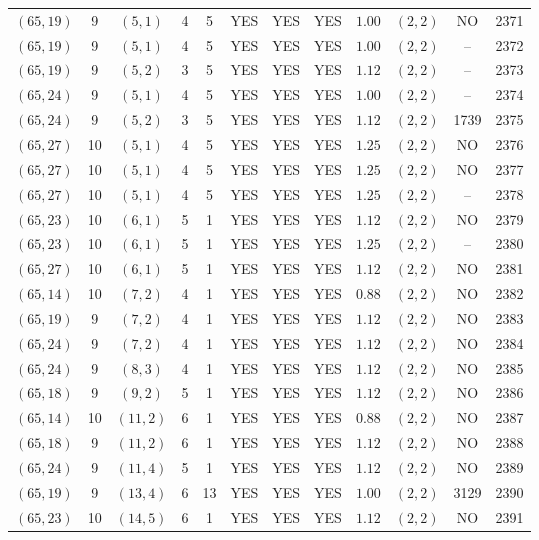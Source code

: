 \begin{longtable}{|c|c|c|c|c|c|c|c|c|c|c|c|}
$(65,19)$ & 9 & $(5,1)$ & 4 & 5 & YES & YES & YES & $1.00$ & $(2,2)$ & NO & 2371\\
$(65,19)$ & 9 & $(5,1)$ & 4 & 5 & YES & YES & YES & $1.00$ & $(2,2)$ & -- & 2372\\
$(65,19)$ & 9 & $(5,2)$ & 3 & 5 & YES & YES & YES & $1.12$ & $(2,2)$ & -- & 2373\\
$(65,24)$ & 9 & $(5,1)$ & 4 & 5 & YES & YES & YES & $1.00$ & $(2,2)$ & -- & 2374\\
$(65,24)$ & 9 & $(5,2)$ & 3 & 5 & YES & YES & YES & $1.12$ & $(2,2)$ & 1739 & 2375\\
$(65,27)$ & 10 & $(5,1)$ & 4 & 5 & YES & YES & YES & $1.25$ & $(2,2)$ & NO & 2376\\
$(65,27)$ & 10 & $(5,1)$ & 4 & 5 & YES & YES & YES & $1.25$ & $(2,2)$ & NO & 2377\\
$(65,27)$ & 10 & $(5,1)$ & 4 & 5 & YES & YES & YES & $1.25$ & $(2,2)$ & -- & 2378\\
$(65,23)$ & 10 & $(6,1)$ & 5 & 1 & YES & YES & YES & $1.12$ & $(2,2)$ & NO & 2379\\
$(65,23)$ & 10 & $(6,1)$ & 5 & 1 & YES & YES & YES & $1.25$ & $(2,2)$ & -- & 2380\\
$(65,27)$ & 10 & $(6,1)$ & 5 & 1 & YES & YES & YES & $1.12$ & $(2,2)$ & NO & 2381\\
$(65,14)$ & 10 & $(7,2)$ & 4 & 1 & YES & YES & YES & $0.88$ & $(2,2)$ & NO & 2382\\
$(65,19)$ & 9 & $(7,2)$ & 4 & 1 & YES & YES & YES & $1.12$ & $(2,2)$ & NO & 2383\\
$(65,24)$ & 9 & $(7,2)$ & 4 & 1 & YES & YES & YES & $1.12$ & $(2,2)$ & NO & 2384\\
$(65,24)$ & 9 & $(8,3)$ & 4 & 1 & YES & YES & YES & $1.12$ & $(2,2)$ & NO & 2385\\
$(65,18)$ & 9 & $(9,2)$ & 5 & 1 & YES & YES & YES & $1.12$ & $(2,2)$ & NO & 2386\\
$(65,14)$ & 10 & $(11,2)$ & 6 & 1 & YES & YES & YES & $0.88$ & $(2,2)$ & NO & 2387\\
$(65,18)$ & 9 & $(11,2)$ & 6 & 1 & YES & YES & YES & $1.12$ & $(2,2)$ & NO & 2388\\
$(65,24)$ & 9 & $(11,4)$ & 5 & 1 & YES & YES & YES & $1.12$ & $(2,2)$ & NO & 2389\\
$(65,19)$ & 9 & $(13,4)$ & 6 & 13 & YES & YES & YES & $1.00$ & $(2,2)$ & 3129 & 2390\\
$(65,23)$ & 10 & $(14,5)$ & 6 & 1 & YES & YES & YES & $1.12$ & $(2,2)$ & NO & 2391\\

\end{longtable}
